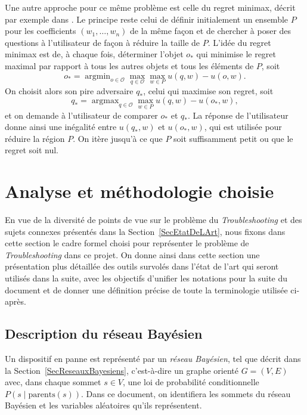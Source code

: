 \documentclass[a4paper,11pt]{article}
\theoremstyle{plain}
\theoremstyle{definition}
\DeclareMathOperator*{\argmax}{argmax}
\DeclareMathOperator*{\argmin}{argmin}
\begin{document}
Une autre approche pour ce même problème est celle du regret minimax, décrit par exemple dans \cite{Boutilier2006Constraint}. Le principe reste celui de définir initialement un ensemble $P$ pour les coefficients $(w_1, \dotsc,\allowbreak w_n)$ de la même façon et de chercher à poser des questions à l'utilisateur de façon à réduire la taille de $P$. L'idée du regret minimax est de, à chaque fois, déterminer l'objet $o_{\ast}$ qui minimise le regret maximal par rapport à tous les autres objets et tous les éléments de $P$, soit
\[o_{\ast} = \argmin_{o \in \mathcal O} \max_{q \in \mathcal O} \max_{w \in P} u(q, w) - u(o, w).\]
On choisit alors son pire adversaire $q_\ast$, celui qui maximise son regret, soit
\[q_{\ast} = \argmax_{q \in \mathcal O} \max_{w \in P} u(q, w) - u(o_\ast, w),\]
et on demande à l'utilisateur de comparer $o_\ast$ et $q_\ast$. La réponse de l'utilisateur donne ainsi une inégalité entre $u(q_\ast, w)$ et $u(o_\ast, w)$, qui est utilisée pour réduire la région $P$. On itère jusqu'à ce que $P$ soit suffisamment petit ou que le regret soit nul.

\section{Analyse et méthodologie choisie}
\label{SecMethodologie}

En vue de la diversité de points de vue sur le problème du \emph{Troubleshooting} et des sujets connexes présentés dans la Section~\ref{SecEtatDeLArt}, nous fixons dans cette section le cadre formel choisi pour représenter le problème de \emph{Troubleshooting} dans ce projet. On donne ainsi dans cette section une présentation plus détaillée des outils survolés dans l'état de l'art qui seront utilisés dans la suite, avec les objectifs d'unifier les notations pour la suite du document et de donner une définition précise de toute la terminologie utilisée ci-après.

\subsection{Description du réseau Bayésien}
\label{SecBayesTroubleshooting}

Un dispositif en panne est représenté par un \emph{réseau Bayésien}, tel que décrit dans la Section~\ref{SecReseauxBayesiens}, c'est-à-dire un graphe orienté $G = (V, E)$ avec, dans chaque sommet $s \in V$, une loi de probabilité conditionnelle $P(s \mid \text{parents}(s))$. Dans ce document, on identifiera les sommets du réseau Bayésien et les variables aléatoires qu'ils représentent.
\end{document}
